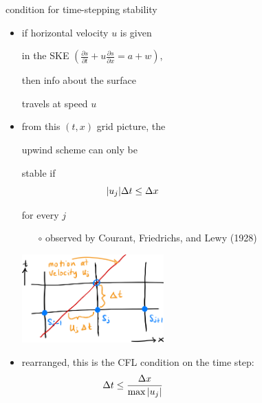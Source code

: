 \documentclass[10pt,dvipsnames]{beamer}
\begin{document}
\begin{frame}{condition for time-stepping stability}

\bigskip\medskip
\begin{itemize}
\item if horizontal velocity $u$ is given

in the SKE $\left(\frac{\partial s}{\partial t} + u \frac{\partial s}{\partial x} = a + w\right)$,

then info about the surface

travels at speed $u$
\item from this $(t,x)$ grid picture, the

upwind scheme can only be

stable if
$$|u_j| \Delta t \le \Delta x \hspace{40mm}$$

for every $j$
    \begin{itemize}
    \item[$\circ$] observed by Courant, Friedrichs, and Lewy (1928)
    \end{itemize}

\vspace{-45mm}
\hfill \includegraphics[width=0.43\textwidth]{cfl.png}

\vspace{15mm}
\item rearranged, this is the \alert{CFL condition} on the time step:
$$\Delta t \le \frac{\Delta x}{\max |u_j|} \hspace{40mm}$$
\end{itemize}
\end{frame}
\end{document}
